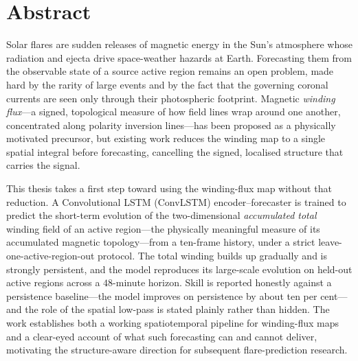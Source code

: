 \chapter*{Abstract}

\vspace{0.6cm}

Solar flares are sudden releases of magnetic energy in the Sun's atmosphere
whose radiation and ejecta drive space-weather hazards at Earth. Forecasting
them from the observable state of a source active region remains an open
problem, made hard by the rarity of large events and by the fact that the
governing coronal currents are seen only through their photospheric footprint.
Magnetic \emph{winding flux}---a signed, topological measure of how field lines
wrap around one another, concentrated along polarity inversion lines---has been
proposed as a physically motivated precursor, but existing work reduces the
winding map to a single spatial integral before forecasting, cancelling the
signed, localised structure that carries the signal.

This thesis takes a first step toward using the winding-flux map without that
reduction. A Convolutional LSTM (ConvLSTM) encoder--forecaster is trained to
predict the short-term evolution of the two-dimensional \emph{accumulated total}
winding field of an active region---the physically meaningful measure of its
accumulated magnetic topology---from a ten-frame history, under a strict
leave-one-active-region-out protocol. The total winding builds up gradually and
is strongly persistent, and the model reproduces its large-scale evolution on
held-out active regions across a $48$-minute horizon. Skill is reported honestly
against a persistence baseline---the model improves on persistence by about ten
per cent---and the role of the spatial low-pass is stated plainly rather than
hidden. The work establishes both a working spatiotemporal pipeline for
winding-flux maps and a clear-eyed account of what such forecasting can and
cannot deliver, motivating the structure-aware direction for subsequent
flare-prediction research.
